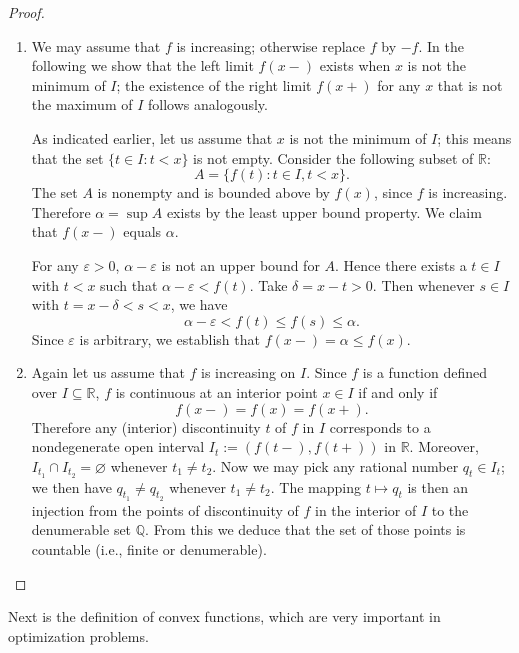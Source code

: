 \documentclass[11pt]{article}
\begin{document}
\begin{proof}
  \begin{enumerate}[$(a)$]
    \item We may assume that $f$ is increasing; otherwise replace $f$ by $-f$.
      In the following we show that the left limit $f(x-)$ exists when $x$ is not the minimum of $I$; the existence of the right limit $f(x+)$ for any $x$ that is not the maximum of $I$ follows analogously. 

      As indicated earlier, let us assume that $x$ is not the minimum of $I$; this means that the set $\{ t \in I \colon t < x \}$ is not empty.
      Consider the following subset of $\mathbb{R}$:
      \[
	A = \{ f(t) \colon t \in I, t < x \}.
      \]
      The set $A$ is nonempty and is bounded above by $f(x)$, since $f$ is increasing.
      Therefore $\alpha = \sup A$ exists by the least upper bound property.
      We claim that $f(x-)$ equals $\alpha$.

      For any $\varepsilon > 0$, $\alpha - \varepsilon$ is not an upper bound for $A$.
      Hence there exists a $t \in I$ with $t < x$ such that $\alpha - \varepsilon < f(t)$.
      Take $\delta = x - t > 0$.  Then whenever $s \in I$ with $t = x - \delta < s < x$, we have
      \[
	\alpha - \varepsilon < f(t) \leqslant f(s) \leqslant \alpha.
      \]
      Since $\varepsilon$ is arbitrary, we establish that $f(x-) = \alpha \leqslant f(x)$. 

    \item Again let us assume that $f$ is increasing on $I$.
      Since $f$ is a function defined over $I \subseteq \mathbb{R}$, $f$ is continuous at an interior point $x \in I$ if and only if
      \[
	f(x-) = f(x) = f(x+).
      \]
      Therefore any (interior) discontinuity $t$ of $f$ in $I$ corresponds to a nondegenerate open interval $I_t := \left( f(t-), f(t+) \right)$ in $\mathbb{R}$.
      Moreover, $I_{t_1} \cap I_{t_2} = \varnothing$ whenever $t_1 \ne t_2$.
      Now we may pick any rational number $q_t \in I_t$; we then have $q_{t_1} \ne q_{t_2}$ whenever $t_1 \ne t_2$.
      The mapping $t \mapsto q_t$ is then an injection from the points of discontinuity of $f$ in the interior of $I$ to the denumerable set $\mathbb{Q}$.
      From this we deduce that the set of those points is countable (i.e., finite or denumerable).
  \end{enumerate}
\end{proof}

Next is the definition of convex functions, which are very important in optimization problems.
\end{document}
